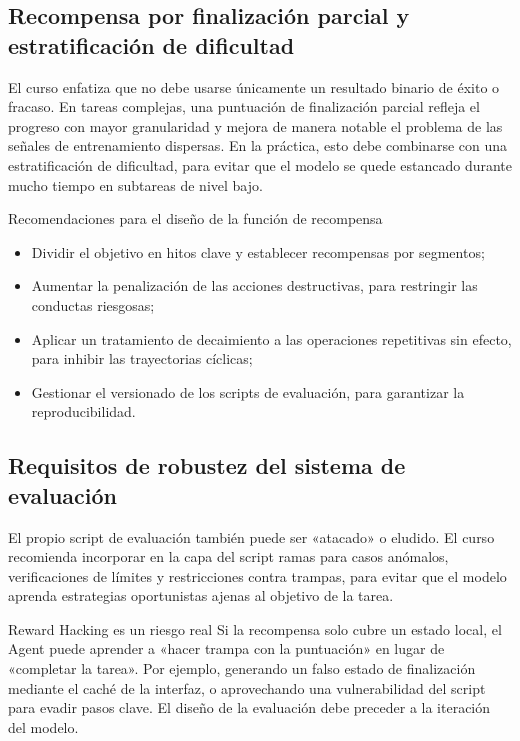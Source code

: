 \documentclass[a4paper]{article}
\begin{document}
\subsection{Recompensa por finalización parcial y estratificación de dificultad}
El curso enfatiza que no debe usarse únicamente un resultado binario de éxito o fracaso. En tareas complejas, una puntuación de finalización parcial refleja el progreso con mayor granularidad y mejora de manera notable el problema de las señales de entrenamiento dispersas. En la práctica, esto debe combinarse con una estratificación de dificultad, para evitar que el modelo se quede estancado durante mucho tiempo en subtareas de nivel bajo.

\begin{knowledgebox}{Recomendaciones para el diseño de la función de recompensa}
\begin{itemize}
    \item Dividir el objetivo en hitos clave y establecer recompensas por segmentos;
    \item Aumentar la penalización de las acciones destructivas, para restringir las conductas riesgosas;
    \item Aplicar un tratamiento de decaimiento a las operaciones repetitivas sin efecto, para inhibir las trayectorias cíclicas;
    \item Gestionar el versionado de los scripts de evaluación, para garantizar la reproducibilidad.
\end{itemize}
\end{knowledgebox}

\subsection{Requisitos de robustez del sistema de evaluación}
El propio script de evaluación también puede ser «atacado» o eludido. El curso recomienda incorporar en la capa del script ramas para casos anómalos, verificaciones de límites y restricciones contra trampas, para evitar que el modelo aprenda estrategias oportunistas ajenas al objetivo de la tarea.

\begin{warningbox}{Reward Hacking es un riesgo real}
Si la recompensa solo cubre un estado local, el Agent puede aprender a «hacer trampa con la puntuación» en lugar de «completar la tarea». Por ejemplo, generando un falso estado de finalización mediante el caché de la interfaz, o aprovechando una vulnerabilidad del script para evadir pasos clave. El diseño de la evaluación debe preceder a la iteración del modelo.
\end{warningbox}
\end{document}
